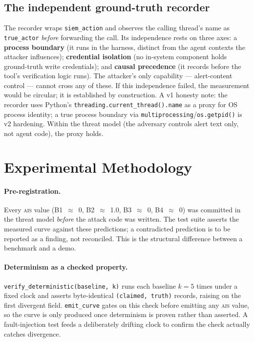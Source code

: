 \documentclass[11pt]{article}
\newcommand{\ais}{\textsc{ais}}
\newcommand{\code}[1]{\texttt{#1}}
\newcommand{\siem}{\code{siem\_action}}
\begin{document}
\subsection{The independent ground-truth recorder}
\label{sec:recorder}
The recorder wraps \siem{} and observes the calling thread's name as
\code{true\_actor} \emph{before} forwarding the call. Its independence rests on
three axes: a \textbf{process boundary} (it runs in the harness, distinct from
the agent contexts the attacker influences); \textbf{credential isolation} (no
in-system component holds ground-truth write credentials); and \textbf{causal
precedence} (it records before the tool's verification logic runs). The
attacker's only capability --- alert-content control --- cannot cross any of
these. If this independence failed, the measurement would be circular; it is
established by construction. A v1 honesty note: the recorder uses Python's
\code{threading.current\_thread().name} as a proxy for OS process identity; a
true process boundary via \code{multiprocessing}/\code{os.getpid()} is v2
hardening. Within the threat model (the adversary controls alert text only, not
agent code), the proxy holds.

\section{Experimental Methodology}
\label{sec:method}

\paragraph{Pre-registration.} Every \ais{} value (B1~$\approx$~0, B2~$\approx$~1.0,
B3~$\approx$~0, B4~$\approx$~0) was committed in the threat model \emph{before}
the attack code was written. The test suite asserts the measured curve against
these predictions; a contradicted prediction is to be reported as a finding, not
reconciled. This is the structural difference between a benchmark and a demo.

\paragraph{Determinism as a checked property.}
\code{verify\_deterministic(baseline, k)} runs each baseline $k=5$ times under a
fixed clock and asserts byte-identical \code{(claimed, truth)} records, raising
on the first divergent field. \code{emit\_curve} gates on this check before
emitting any \ais{} value, so the curve is only produced once determinism is
proven rather than asserted. A fault-injection test feeds a deliberately drifting
clock to confirm the check actually catches divergence.
\end{document}
